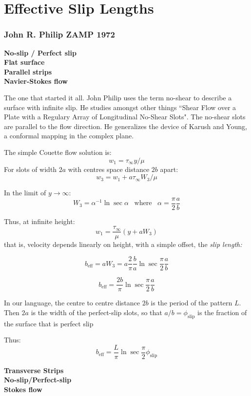 \documentclass{article}
\begin{document}
\section*{Effective Slip Lengths}

\subsubsection*{John R. Philip ZAMP 1972}

\textbf{No-slip / Perfect slip \\ Flat surface \\ Parallel strips \\ Navier-Stokes flow }

The one that started it all.  John Philip uses the term no-shear to describe a surface with infinite slip.  He studies amongst other things ``Shear Flow over a Plate with a Regulary Array of Longitudinal No-Shear Slots".  The no-shear slots are parallel to the flow direction.  He generalizes the device of Karush and Young, a conformal mapping in the complex plane.

The simple Couette flow solution is:
\[ w_{1} = \tau_{\infty} y / \mu  \]
For slots of width $2a$ with centres space distance $2b$ apart:
\[ w_{3} = w_{1} + a \tau_{\infty} W_{3} / \mu \]

In the limit of $y \rightarrow \infty$:
\[ W_{3} = \alpha^{-1} \ln \sec \alpha \;\;\; \mathrm{where}\;\;\;
\alpha = \frac{\pi}{2} \frac{a}{b} \]

Thus, at infinite height:
\[ w_{1} = \frac{\tau_{\infty}}{\mu} \left(y + a W_{3}  \right) \]
that is, velocity depends linearly on height, with a simple offset, the \emph{slip length:}

\[ b_{\mathrm{eff}} = a W_{3} = a \frac{2}{\pi} \frac{b}{a} \ln \sec \frac{\pi}{2} \frac{a}{b} \]

\[ b_{\mathrm{eff}} = \frac{2b}{\pi} \ln \sec \frac{\pi}{2} \frac{a}{b} \]

In our language, the centre to centre distance $2b$ is the period of the pattern $L$.  Then $2a$ is the width of the perfect-slip slots, so that $a/b = \phi_{\mathrm{slip}}$ is the fraction of the surface that is perfect slip

Thus:
\[ b_{\mathrm{eff}} = \frac{L}{\pi} \ln \sec \frac{\pi}{2} \phi_{\mathrm{slip}} \]


\textbf{Transverse Strips\\ No-slip/Perfect-slip \\ Stokes flow \\}
\end{document}

